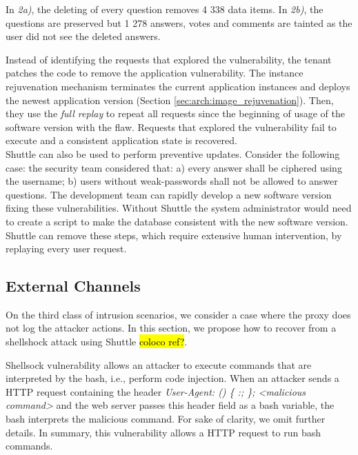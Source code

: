 In \textit{2a)}, the deleting of every question removes 4 338 data items. In \textit{2b)}, the questions are preserved but 1 278 answers, votes and comments are tainted as the user did not see the deleted answers.



Instead of identifying the requests that explored the vulnerability, the tenant patches the code to remove the application vulnerability. The instance rejuvenation mechanism terminates the current application instances and deploys the newest application version (Section \ref{sec:arch:image_rejuvenation}). Then, they use the \textit{full replay} to repeat all requests since the beginning of usage of the software version with the flaw. Requests that explored the vulnerability fail to execute and a consistent application state is recovered.\\

Shuttle can also be used to perform preventive updates. Consider the following case: the security team considered that: a) every answer shall be ciphered using the username; b) users without weak-passwords shall not be allowed to answer questions. The development team can rapidly develop a new software version fixing these vulnerabilities. Without Shuttle the system administrator would need to create a script to make the database consistent with the new software version. Shuttle can remove these steps, which require extensive human intervention, by replaying every user request.

\subsection{External Channels}\label{sec:eval:accuracy:external}
On the third class of intrusion scenarios, we consider a case where the proxy does not log the attacker actions. In this section, we propose how to recover from a shellshock attack using Shuttle \hl{coloco ref?}. 

Shellsock vulnerability allows an attacker to execute commands that are interpreted by the bash, i.e., perform code injection. When an attacker sends a \ac{HTTP} request containing the header \emph{User-Agent: () \{ :; \}; <malicious command>} and the web server passes this header field as a bash variable, the bash interprets the malicious command. For sake of clarity, we omit further details. In summary, this vulnerability allows a \ac{HTTP} request to run bash commands.

